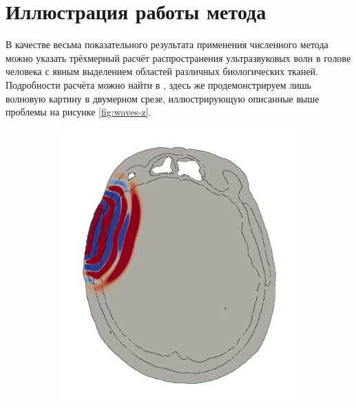 \documentclass[a4paper]{article}
\numberwithin{equation}{section}
\begin{document}
\section{Иллюстрация работы метода}
В качестве весьма показательного результата применения численного метода можно 
указать трёхмерный расчёт распространения ультразвуковых волн в голове человека 
с явным выделением областей различных биологических тканей. 
Подробности расчёта можно найти в \cite{skull}, здесь же продемонстрируем лишь 
волновую картину в двумерном срезе, иллюстрирующую описанные выше проблемы 
на рисунке \ref{fig:waves-z}. 
\begin{figure}[h]
\centering
\begin{subfigure}{.18\textwidth}
  \centering
  \includegraphics[width=1.0\linewidth]{pictures/skull/elastic-pressure-z-with-bounds/six/1.png}
\end{subfigure}
\begin{subfigure}{.18\textwidth}
  \centering

\end{subfigure}
\end{figure}
\end{document}
